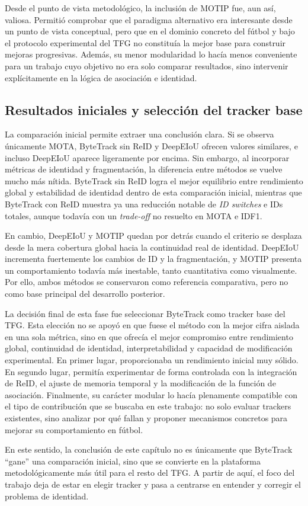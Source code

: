 \documentclass[../MAIN.tex]{subfiles}
\begin{document}
	Desde el punto de vista metodológico, la inclusión de MOTIP fue, aun así, valiosa. Permitió comprobar que el paradigma alternativo era interesante desde un punto de vista conceptual, pero que en el dominio concreto del fútbol y bajo el protocolo experimental del TFG no constituía la mejor base para construir mejoras progresivas. Además, su menor modularidad lo hacía menos conveniente para un trabajo cuyo objetivo no era solo comparar resultados, sino intervenir explícitamente en la lógica de asociación e identidad.
	
	\subsection{Resultados iniciales y selección del tracker base}
	
	La comparación inicial permite extraer una conclusión clara. Si se observa únicamente MOTA, ByteTrack sin ReID y DeepEIoU ofrecen valores similares, e incluso DeepEIoU aparece ligeramente por encima. Sin embargo, al incorporar métricas de identidad y fragmentación, la diferencia entre métodos se vuelve mucho más nítida. ByteTrack sin ReID logra el mejor equilibrio entre rendimiento global y estabilidad de identidad dentro de esta comparación inicial, mientras que ByteTrack con ReID muestra ya una reducción notable de \textit{ID switches} e IDs totales, aunque todavía con un \textit{trade-off} no resuelto en MOTA e IDF1.
	
	En cambio, DeepEIoU y MOTIP quedan por detrás cuando el criterio se desplaza desde la mera cobertura global hacia la continuidad real de identidad. DeepEIoU incrementa fuertemente los cambios de ID y la fragmentación, y MOTIP presenta un comportamiento todavía más inestable, tanto cuantitativa como visualmente. Por ello, ambos métodos se conservaron como referencia comparativa, pero no como base principal del desarrollo posterior.
	
	La decisión final de esta fase fue seleccionar ByteTrack como tracker base del TFG. Esta elección no se apoyó en que fuese el método con la mejor cifra aislada en una sola métrica, sino en que ofrecía el mejor compromiso entre rendimiento global, continuidad de identidad, interpretabilidad y capacidad de modificación experimental. En primer lugar, proporcionaba un rendimiento inicial muy sólido. En segundo lugar, permitía experimentar de forma controlada con la integración de ReID, el ajuste de memoria temporal y la modificación de la función de asociación. Finalmente, su carácter modular lo hacía plenamente compatible con el tipo de contribución que se buscaba en este trabajo: no solo evaluar trackers existentes, sino analizar por qué fallan y proponer mecanismos concretos para mejorar su comportamiento en fútbol.
	
	En este sentido, la conclusión de este capítulo no es únicamente que ByteTrack “gane” una comparación inicial, sino que se convierte en la plataforma metodológicamente más útil para el resto del TFG. A partir de aquí, el foco del trabajo deja de estar en elegir tracker y pasa a centrarse en entender y corregir el problema de identidad.
	
	\newpage
	
\end{document}
